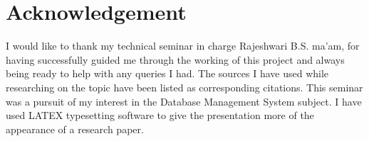 \documentclass[12pt]{article}
\begin{document}
\section{Acknowledgement}
\begin{flushleft}
I would like to thank my technical seminar in charge  Rajeshwari B.S. ma'am, for having successfully guided me through the working of this project and always being ready to help with any queries I had. The sources I have used while researching on the topic have been listed as corresponding citations. This seminar was a pursuit of my interest in the Database Management System subject. I have used LATEX typesetting software to give the presentation more of the appearance of a research paper.
\end{flushleft}


\end{document}

